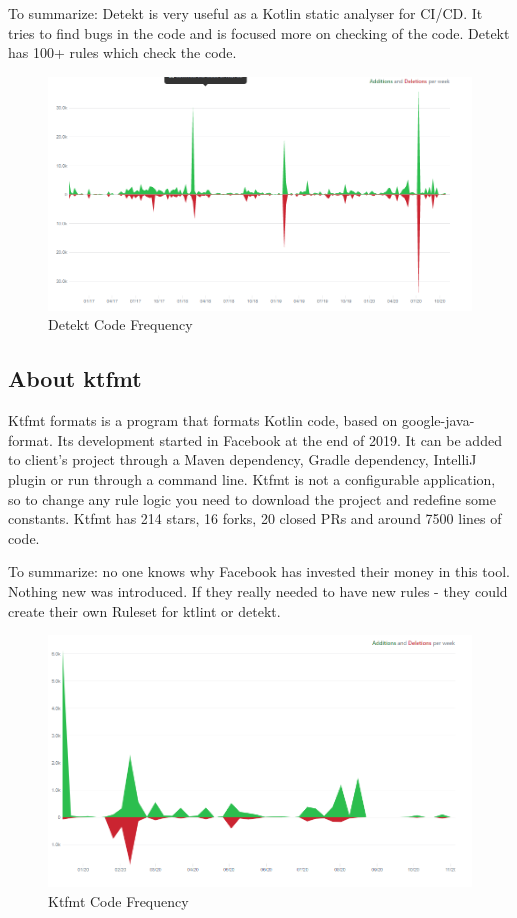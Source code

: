 To summarize: Detekt is very useful as a Kotlin static analyser for CI/CD. It tries to find bugs in the code and is focused more on checking of the code. Detekt has 100+ rules which check the code.

\begin{figure}[H]
    \centering
    \includegraphics[scale = 0.6]{pictures/detekt.png}
    \caption{Detekt Code Frequency}
    \label{fig:png_detekt}
\end{figure}

\subsection{About ktfmt}
Ktfmt formats is a program that formats Kotlin code, based on google-java-format. Its development started in Facebook at the end of 2019. It can be added to client’s project through a Maven dependency, Gradle dependency, IntelliJ plugin or run through a command line. Ktfmt is not a configurable application, so to change any rule logic you need to download the project and redefine some constants. Ktfmt has 214 stars, 16 forks, 20 closed PRs and around 7500 lines of code.

To summarize: no one knows why Facebook has invested their money in this tool. Nothing new was introduced. If they really needed to have new rules - they could create their own Ruleset for ktlint or detekt.

\begin{figure}[H]
    \centering
    \includegraphics[scale = 0.6]{pictures/ktfmt.png}
    \caption{Ktfmt Code Frequency}
    \label{fig:png_ktfmt}
\end{figure}

